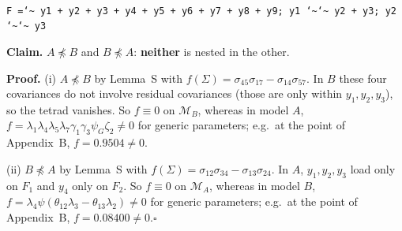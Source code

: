\documentclass[10pt,a4paper]{article}
\newcommand{\nnest}{\not\preceq}
\begin{document}
\begin{minipage}[t]{0.49\textwidth}
\\[1pt]{\scriptsize \texttt{F =\char`\~{} y1 + y2 + y3 + y4 + y5 + y6 + y7 + y8 + y9; y1 \char`\~{}\char`\~{} y2 + y3; y2 \char`\~{}\char`\~{} y3}}\end{minipage}
\par\bigskip
\noindent\textbf{Claim.} $A \nnest B$ and $B \nnest A$: \textbf{neither} is nested in the other.\par\smallskip
\noindent\textbf{Proof.} (i) $A\nnest B$ by Lemma~S with $f(\Sigma)=\sigma_{45}\sigma_{17} - \sigma_{14}\sigma_{57}$. In $B$ these four covariances do not involve residual covariances (those are only within $y_1,y_2,y_3$), so the tetrad vanishes. So $f\equiv0$ on $\mathcal M_B$, whereas in model $A$, $f=\lambda_1\lambda_4\lambda_5\lambda_7\gamma_1\gamma_3\psi_G\zeta_2\neq0$ for generic parameters; e.g.\ at the point of Appendix~B, $f=0.9504\neq0$.\par\smallskip
\noindent(ii) $B\nnest A$ by Lemma~S with $f(\Sigma)=\sigma_{12}\sigma_{34} - \sigma_{13}\sigma_{24}$. In $A$, $y_1,y_2,y_3$ load only on $F_1$ and $y_4$ only on $F_2$. So $f\equiv0$ on $\mathcal M_A$, whereas in model $B$, $f=\lambda_4\psi(\theta_{12}\lambda_3-\theta_{13}\lambda_2)\neq0$ for generic parameters; e.g.\ at the point of Appendix~B, $f=0.08400\neq0$.\hfill$\square$\par\medskip
{}

\clearpage
\end{document}
